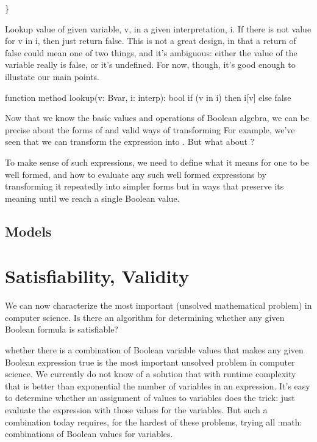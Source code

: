 \documentclass[letterpaper,10pt,english]{sphinxmanual}
\begin{document}
\}

Lookup value of given variable, v, in a given interpretation, i. If
there is not value for v in i, then just return false. This is not a
great design, in that a return of false could mean one of two things,
and it’s ambiguous: either the value of the variable really is false,
or it’s undefined.  For now, though, it’s good enough to illustate our
main points.

\begin{sphinxVerbatim}[commandchars=\\\{\}]
function method lookup(v: Bvar, i: interp): bool
\PYGZob{}
    if (v in i) then i[v]
    else false
\PYGZcb{}
\end{sphinxVerbatim}

Now that we know the basic values and operations of Boolean algebra,
we can be precise about the forms of and valid ways of transforming
 For example, we’ve seen that we can transform
the expression  into . But what about ?

To make sense of such expressions, we need to define what it means for
one to be well formed, and how to evaluate any such well formed
expressions by transforming it repeatedly into simpler forms but in
ways that preserve its meaning until we reach a single Boolean value.


\subsection{Models}
\label{\detokenize{09-propositional-logic:models}}

\section{Satisfiability, Validity}
\label{\detokenize{09-propositional-logic:satisfiability-validity}}
We can now characterize the most important  (unsolved
mathematical problem) in computer science.  Is there an 
algorithm for determining whether any given Boolean formula is
satisfiable?

whether there is a combination of Boolean
variable values that makes any given Boolean expression true is the
most important unsolved problem in computer science. We currently do
not know of a solution that with runtime complexity that is better
than exponential the number of variables in an expression.  It’s easy
to determine whether an assignment of values to variables does the
trick: just evaluate the expression with those values for the
variables. But  such a combination today requires, for the
hardest of these problems, trying all :math: combinations of
Boolean values for  variables.
\end{document}
